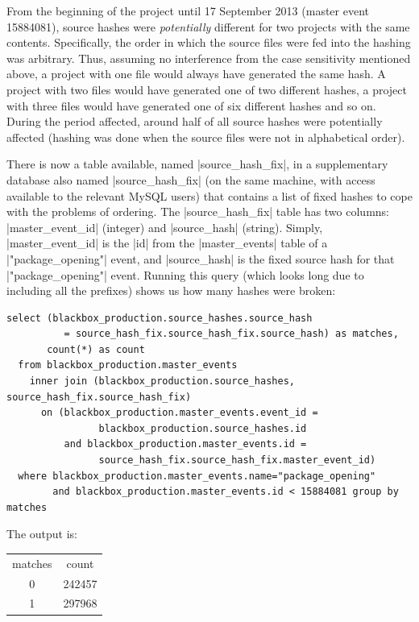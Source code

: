 \documentclass{report}
\begin{document}
From the beginning of the project until 17 September 2013 (master event 15884081), source hashes were \textit{potentially} different for two projects with the same contents.  Specifically, the order in which the source files were fed into the hashing was arbitrary.  Thus, assuming no interference from the case sensitivity mentioned above, a project with one file would always have generated the same hash.  A project with two files would have generated one of two different hashes, a project with three files would have generated one of six different hashes and so on.  During the period affected, around half of all source hashes were potentially affected (hashing was done when the source files were not in alphabetical order).

There is now a table available, named |source_hash_fix|, in a supplementary database also named |source_hash_fix| (on the same machine, with access available to the relevant MySQL users) that contains a list of fixed hashes to cope with the problems of ordering.  The |source_hash_fix| table has two columns: |master_event_id| (integer) and |source_hash| (string).  Simply, |master_event_id| is the |id| from the |master_events| table of a |"package_opening"| event, and |source_hash| is the fixed source hash for that |"package_opening"| event.  Running this query (which looks long due to including all the prefixes) shows us how many hashes were broken:

\begin{lstlisting}
select (blackbox_production.source_hashes.source_hash
          = source_hash_fix.source_hash_fix.source_hash) as matches,
       count(*) as count
  from blackbox_production.master_events
    inner join (blackbox_production.source_hashes, source_hash_fix.source_hash_fix)
      on (blackbox_production.master_events.event_id =
                blackbox_production.source_hashes.id
          and blackbox_production.master_events.id =
                source_hash_fix.source_hash_fix.master_event_id)
  where blackbox_production.master_events.name="package_opening"
        and blackbox_production.master_events.id < 15884081 group by matches
\end{lstlisting}

The output is:

\begin{tabular}{cc}
matches & count \\
0 & 242457 \\
1 & 297968 \\
\end{tabular}
\end{document}
